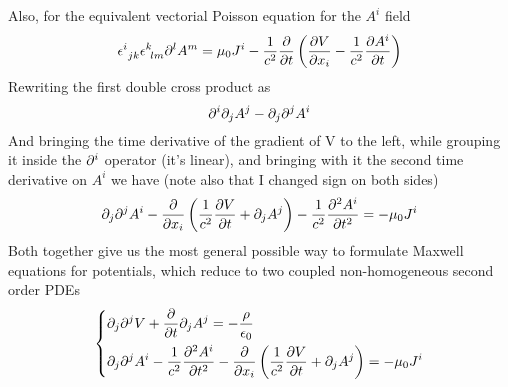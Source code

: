 \documentclass[../electromagnetism.tex]{subfiles}
\begin{document}
Also, for the equivalent vectorial Poisson equation for the $A^i$ field
\begin{equation*}
	\epsilon^{i}_{\ jk}\epsilon^{k}_{\ lm}\partial^lA^m=\mu_0J^i-\frac{1}{c^2}\pdv{t}\left( \pdv{V}{x_i}-\frac{1}{c^2}\pdv{A^i}{t} \right)
\end{equation*}
Rewriting the first double cross product as
\begin{equation*}
	\partial^i\partial_jA^j-\partial_j\partial^jA^i
\end{equation*}
And bringing the time derivative of the gradient of V to the left, while grouping it inside the $\partial^i$ operator (it's linear), and bringing with it the second time derivative on $A^i$ we have (note also that I changed sign on both sides)
\begin{equation}
	\partial_j\partial^jA^i-\pdv{x_i}\left( \frac{1}{c^2}\pdv{V}{t}+\partial_jA^j \right)-\frac{1}{c^2}\pdv[2]{A^i}{t}=-\mu_0J^i
	\label{eq:poissondynamiceq-A}
\end{equation}
Both together give us the most general possible way to formulate Maxwell equations for potentials, which reduce to two coupled non-homogeneous second order PDEs 
\begin{equation}
	\left\{ \begin{aligned}
			&\partial_j\partial^jV+\pdv{t}\partial_jA^j=-\frac{\rho}{\epsilon_0}\\
			&\partial_j\partial^jA^i-\frac{1}{c^2}\pdv[2]{A^i}{t}-\pdv{x_i}\left( \frac{1}{c^2}\pdv{V}{t}+\partial_jA^j \right)=-\mu_0J^i
	\end{aligned}\right.
	\label{eq:mweqpot}
\end{equation}
\end{document}

